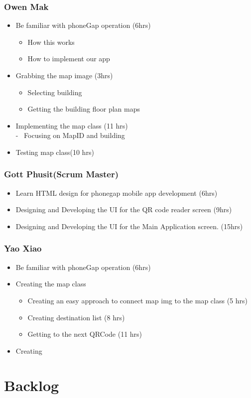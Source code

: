 \documentclass[12pt]{article}
\begin{document}
\subsubsection*{Owen Mak}
\begin{itemize}
\item Be familiar with phoneGap operation (6hrs)
\begin{itemize} \renewcommand{\labelitemii}{-}
	\item How this works
	\item How to implement our app
\end{itemize}

\item Grabbing the map image   (3hrs)
\begin{itemize} \renewcommand{\labelitemii}{-}
	\item Selecting building
	\item Getting the building floor plan maps
\end{itemize}

\item Implementing the map class (11 hrs) \\ - \ Focusing on MapID and building 
\item Testing map class(10 hrs)
\end{itemize}



\subsubsection*{Gott Phusit(Scrum Master)}
\begin{itemize}
\item Learn HTML design for phonegap mobile app development (6hrs)
\item Designing and Developing the UI for the QR code reader screen (9hrs)
\item Designing and Developing the UI for the Main Application screen. (15hrs)

\end{itemize}

\subsubsection*{Yao Xiao}
\begin{itemize}
\item Be familiar with phoneGap operation (6hrs)
\item Creating the map class  
	\begin{itemize}
		\item Creating an easy approach to connect map img to the map class (5 hrs)
		\item Creating destination list (8 hrs)		
		\item Getting to the next QRCode (11 hrs)
	\end{itemize}
\item Creating

\end{itemize}

\section{Backlog}
\end{document}

